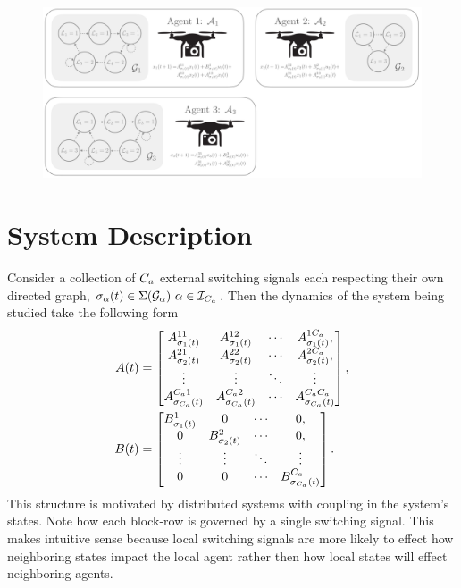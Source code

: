 \begin{figure}[t]
\centering
\includegraphics[width=\textwidth]{./figures/sample_system}
\end{figure}

\section{System Description}
Consider a collection of ${C_a}$ external switching signals each respecting their own directed graph, $\ss_\agentidx(t)\in\Sigma(\graph_\agentidx)\ \agentidx\in\idxset{\numagents}$. Then the dynamics of the system being studied take the following form
\begin{align}
A(t)&=\begin{bmatrix}
A^{11}_{{\sigma}_1(t)}&A^{12}_{{\sigma}_1(t)}&\cdots&A^{1{C_a}}_{{\sigma}_1(t)},\\
A^{21}_{{\sigma}_2(t)}&A^{22}_{{\sigma}_2(t)}&\cdots&A^{2{C_a}}_{{\sigma}_2(t)},\\
\vdots&\vdots & \ddots & \vdots\\
A^{{C_a} 1}_{{\sigma}_{{C_a}}(t)} & A^{{C_a} 2}_{{\sigma}_{{C_a}}(t)} &\cdots & A^{{C_a} {C_a}}_{{\sigma}_{{C_a}}(t)} 
\end{bmatrix},\\
B(t)&=\begin{bmatrix}
B^{1}_{{\sigma}_1(t)}&0&\cdots&0,\\
0&B^{2}_{{\sigma}_2(t)}&\cdots&0,\\
\vdots&\vdots & \ddots & \vdots\\
0 & 0 &\cdots & B^{{C_a}}_{{\sigma}_{{C_a}}(t)} 
\end{bmatrix}.
\end{align}
This structure is motivated by distributed systems with coupling in the system's states. Note how each block-row is governed by a single switching signal. This makes intuitive sense because local switching signals are more likely to effect how neighboring states impact the local agent rather then how local states will effect neighboring agents.

